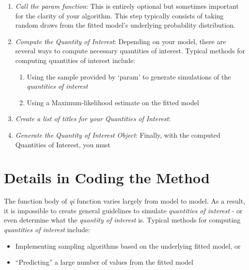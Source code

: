 \begin{enumerate}

	\item \emph{Call the param function}:  This is entirely optional but
		sometimes important for the clarity of your algorithm.  This step
		typically consists of taking random draws from the fitted model's
		underlying probability distribution.
		
	\item \emph{Compute the Quantity of Interest}: Depending on your model,
		there are several ways to compute necessary quantities of interest.
		Typical methods for computing quantities of interest include:
		\begin{enumerate}
			
			\item Using the sample provided by `param' to generate simulations
				of the \emph{quantities of interest}
			
			\item Using a Maximum-likelihood estimate on the fitted model
			
		\end{enumerate}
		
	\item \emph{Create a list of titles for your Quantities of Interest}: 
	
	\item \emph{Generate the Quantity of Interest Object}: Finally, with the
		computed Quantities of Interest, you must
		
\end{enumerate}



\section{Details in Coding the  Method}
\label{section:qi-details}

The function body of \emph{qi} function varies largely from model to model.  As a
result, it is impossible to create general guidelines to simulate \emph{quantities of
interest} - or even determine what the \emph{quantity of interest} is.  Typical methods
for computing \emph{quantities of interest} include:

\begin{itemize}

	\item Implementing sampling algorithms based on the underlying fitted model, or

	\item ``Predicting'' a large number of values from the fitted model

\end{itemize}



